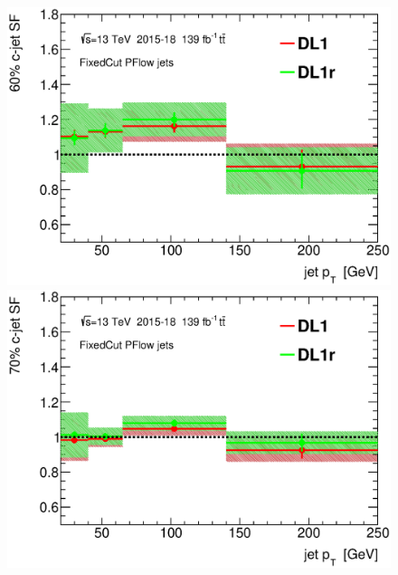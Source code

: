 \documentclass[letterpaper,12pt]{article}
\begin{document}
\begin{figure}[H]
\begin{minipage}[b]{.45\textwidth}
\centering
\includegraphics[width=1\textwidth]{SFplots_december/DL1allPFlowDec_DL1rallPFlowDec/SF60.eps}
\end{minipage}\hfill
\begin{minipage}[b]{.45\textwidth}
\centering
\includegraphics[width=1\textwidth]{SFplots_december/DL1allPFlowDec_DL1rallPFlowDec/SF70.eps}
\end{minipage}\hfill
\begin{minipage}[b]{.45\textwidth}
\centering

\end{minipage}
\end{figure}
\end{document}
